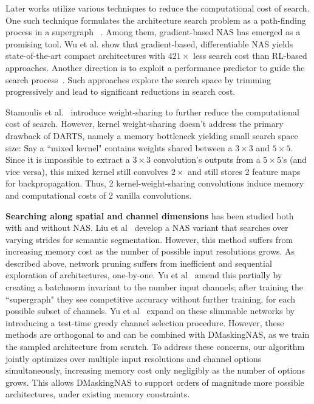 \documentclass[10pt,twocolumn,letterpaper]{article}
\begin{document}
Later works utilize various techniques to reduce the computational cost of search. One such technique formulates the architecture search problem as a path-finding process in a supergraph ~\cite{fbnet, darts, one-shot, single_path}. Among them, gradient-based NAS has emerged as a promising tool. Wu et al. show that gradient-based, differentiable NAS yields state-of-the-art compact architectures with $421\times$ less search cost than RL-based approaches. Another direction is to exploit a performance predictor to guide the search process~\cite{chamnet, progressive}. Such approaches explore the search space by trimming progressively and lead to significant reductions in search cost. 

Stamoulis et al.~\cite{singlepathnas} introduce weight-sharing to further reduce the computational cost of search. However, kernel weight-sharing doesn't address the primary drawback of DARTS, namely a memory bottleneck yielding small search space size: Say a ``mixed kernel" contains weights shared between a $3\times3$ and $5\times5$. Since it is impossible to extract a $3\times3$ convolution's outputs from a $5\times5$'s (and vice versa), this mixed kernel still convolves $2\times$ and still stores 2 feature maps for backpropagation. Thus, 2 kernel-weight-sharing convolutions induce memory and computational costs of 2 vanilla convolutions.



\textbf{Searching along spatial and channel dimensions} has been studied both with and without NAS. Liu et al~\cite{autodeeplab} develop a NAS variant that searches over varying strides for semantic segmentation. However, this method suffers from increasing memory cost as the number of possible input resolutions grows. As described above, network pruning suffers from inefficient and sequential exploration of architectures, one-by-one. Yu et al~\cite{slimmable} amend this partially by creating a batchnorm invariant to the number input channels; after training the ``supergraph" they see competitive accuracy without further training, for each possible subset of channels. Yu et al~\cite{autoslim} expand on these slimmable networks by introducing a test-time greedy channel selection procedure. However, these methods are orthogonal to and can be combined with DMaskingNAS, as we train the sampled architecture from scratch. To address these concerns, our algorithm jointly optimizes over multiple input resolutions and channel options simultaneously, increasing memory cost only negligibly as the number of options grows. This allows DMaskingNAS to support orders of magnitude more possible architectures, under existing memory constraints.
\end{document}
